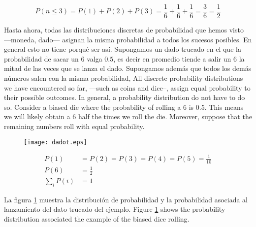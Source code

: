 \begin{equation*}
P(n\leqslant 3) = P(1) + P(2) + P(3) = \frac{1}{6}+\frac{1}{6}+\frac{1}{6}=\frac{3}{6} = \frac{1}{2}
\end{equation*} 
\begin{paracol}{2}
Hasta ahora, todas las distribuciones discretas de probabilidad que hemos visto ---moneda, dado--- asignan la misma probabilidad a todos los sucesos posibles. En general esto no tiene porqué ser así. Supongamos un dado trucado en el que la probabilidad de sacar un $6$ valga $0.5$, es decir en promedio tiende a salir un $6$ la mitad de las veces que se lanza el dado. Supongamos además que todos los demás números salen con la misma probabilidad,
\switchcolumn
All discrete probability distributions we have encountered  so far, ---such as coins and dice--, assign equal probability to their possible outcomes. In general, a probability distribution do not have to do so. Consider a biased die where the probability of rolling a 6 is 0.5. This means we will likely obtain a 6 half the times we roll the die. Moreover, suppose that the remaining numbers roll with equal probability.   
\end{paracol}

\begin{figure}
	\centering
	\texttt{[image: dadot.eps]}
	\label{fig:dadot}
\end{figure}

\begin{align*}
P(1)& = P(2) = P(3) = P(4) = P(5) = \frac{1}{10}\\
P(6)& = \frac{1}{2}\\
\sum_i P(i)& = 1 
\end{align*}
\begin{paracol}{2}
La figura \ref{fig:dadot} muestra la distribución de probabilidad y la probabilidad asociada al lanzamiento del dato trucado del ejemplo.
\switchcolumn
Figure \ref{fig:dadot} shows the probability distribution associated the example of the biased dice rolling.
\end{paracol}

